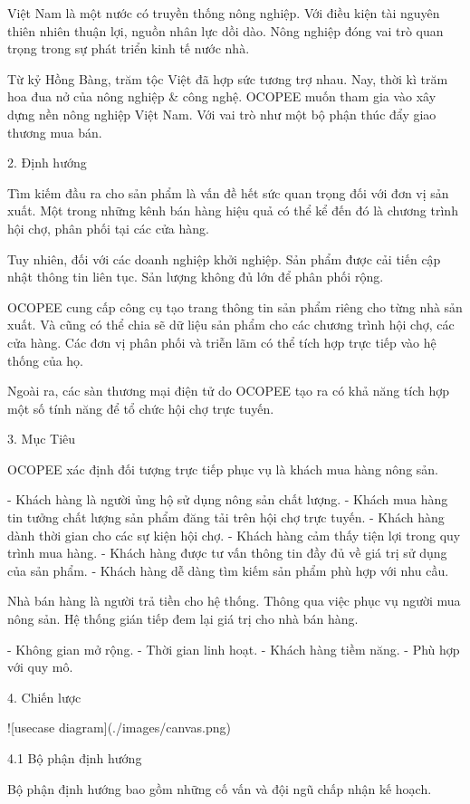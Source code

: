 \documentclass{report}
\begin{document}
Việt Nam là một nước có truyền thống nông nghiệp. Với điều kiện tài nguyên thiên nhiên thuận lợi, nguồn nhân lực dồi
dào. Nông nghiệp đóng vai trò quan trọng trong sự phát triển kinh tế nước nhà.

Từ kỷ Hồng Bàng, trăm tộc Việt đã hợp sức tương trợ nhau. Nay, thời kì trăm hoa đua nở của nông nghiệp \& công nghệ. OCOPEE muốn tham gia vào xây dựng nền nông nghiệp Việt Nam. Với vai trò như một bộ phận thúc đẩy giao thương mua bán.

2. Định hướng

Tìm kiếm đầu ra cho sản phẩm là vấn đề hết sức quan trọng đối với đơn vị sản xuất. Một trong những kênh bán hàng hiệu
quả có thể kể đến đó là chương trình hội chợ, phân phối tại các cửa hàng.

Tuy nhiên, đối với các doanh nghiệp khởi nghiệp. Sản phẩm được cải tiến cập nhật thông tin liên tục. Sản lượng không đủ lớn để phân phối rộng.

OCOPEE cung cấp công cụ tạo trang thông tin sản phẩm riêng cho từng nhà sản xuất. Và cũng có thể chia sẽ dữ liệu sản phẩm cho các chương trình hội chợ, các cửa hàng. Các đơn vị phân phối và triễn lãm có thể tích hợp trực tiếp vào hệ thống của họ.

Ngoài ra, các sàn thương mại điện tử do OCOPEE tạo ra có khả năng tích hợp một số tính năng để tổ chức hội chợ trực tuyến.

3. Mục Tiêu

OCOPEE xác định đối tượng trực tiếp phục vụ là khách mua hàng nông sản.

- Khách hàng là người ủng hộ sử dụng nông sản chất lượng.
- Khách mua hàng tin tưởng chất lượng sản phẩm đăng tải trên hội chợ trực tuyến.
- Khách hàng dành thời gian cho các sự kiện hội chợ.
- Khách hàng cảm thấy tiện lợi trong quy trình mua hàng.
- Khách hàng được tư vấn thông tin đầy đủ về giá trị sử dụng của sản phẩm.
- Khách hàng dễ dàng tìm kiếm sản phẩm phù hợp với nhu cầu.

Nhà bán hàng là người trả tiền cho hệ thống. Thông qua việc phục vụ người mua nông sản. Hệ thống gián tiếp đem lại giá
trị cho nhà bán hàng.

- Không gian mở rộng.
- Thời gian linh hoạt.
- Khách hàng tiềm năng.
- Phù hợp với quy mô.

4. Chiến lược

![usecase diagram](./images/canvas.png)

4.1 Bộ phận định hướng

Bộ phận định hướng bao gồm những cố vấn và đội ngũ chấp nhận kế hoạch.
\end{document}
